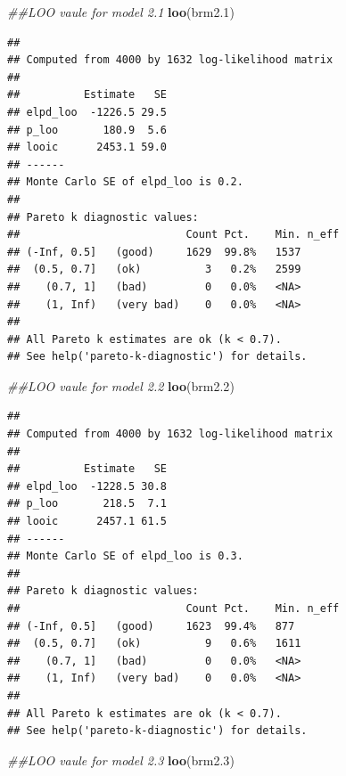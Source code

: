 \documentclass[
]{article}
\newenvironment{Shaded}{\begin{snugshade}}{\end{snugshade}}
\newcommand{\CommentTok}[1]{\textcolor[rgb]{0.56,0.35,0.01}{\textit{#1}}}
\newcommand{\FloatTok}[1]{\textcolor[rgb]{0.00,0.00,0.81}{#1}}
\newcommand{\KeywordTok}[1]{\textcolor[rgb]{0.13,0.29,0.53}{\textbf{#1}}}
\newcommand{\NormalTok}[1]{#1}
\begin{document}
\begin{Shaded}
\begin{Highlighting}[]
\CommentTok{##LOO vaule for model 2.1}
\KeywordTok{loo}\NormalTok{(brm2}\FloatTok{.1}\NormalTok{)}
\end{Highlighting}
\end{Shaded}

\begin{verbatim}
## 
## Computed from 4000 by 1632 log-likelihood matrix
## 
##          Estimate   SE
## elpd_loo  -1226.5 29.5
## p_loo       180.9  5.6
## looic      2453.1 59.0
## ------
## Monte Carlo SE of elpd_loo is 0.2.
## 
## Pareto k diagnostic values:
##                          Count Pct.    Min. n_eff
## (-Inf, 0.5]   (good)     1629  99.8%   1537      
##  (0.5, 0.7]   (ok)          3   0.2%   2599      
##    (0.7, 1]   (bad)         0   0.0%   <NA>      
##    (1, Inf)   (very bad)    0   0.0%   <NA>      
## 
## All Pareto k estimates are ok (k < 0.7).
## See help('pareto-k-diagnostic') for details.
\end{verbatim}

\begin{Shaded}
\begin{Highlighting}[]
\CommentTok{##LOO vaule for model 2.2}
\KeywordTok{loo}\NormalTok{(brm2}\FloatTok{.2}\NormalTok{)}
\end{Highlighting}
\end{Shaded}

\begin{verbatim}
## 
## Computed from 4000 by 1632 log-likelihood matrix
## 
##          Estimate   SE
## elpd_loo  -1228.5 30.8
## p_loo       218.5  7.1
## looic      2457.1 61.5
## ------
## Monte Carlo SE of elpd_loo is 0.3.
## 
## Pareto k diagnostic values:
##                          Count Pct.    Min. n_eff
## (-Inf, 0.5]   (good)     1623  99.4%   877       
##  (0.5, 0.7]   (ok)          9   0.6%   1611      
##    (0.7, 1]   (bad)         0   0.0%   <NA>      
##    (1, Inf)   (very bad)    0   0.0%   <NA>      
## 
## All Pareto k estimates are ok (k < 0.7).
## See help('pareto-k-diagnostic') for details.
\end{verbatim}

\begin{Shaded}
\begin{Highlighting}[]
\CommentTok{##LOO vaule for model 2.3}
\KeywordTok{loo}\NormalTok{(brm2}\FloatTok{.3}\NormalTok{)}
\end{Highlighting}
\end{Shaded}
\end{document}
